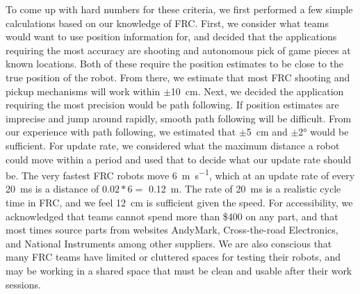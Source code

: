 \documentclass{article}
\begin{document}
  To come up with hard numbers for these criteria, we first performed a few simple calculations based on our knowledge of FRC. First, we consider what teams would want to use position information for, and decided that the applications requiring the most accuracy are shooting and autonomous pick of game pieces at known locations. Both of these require the position estimates to be close to the true position of the robot. From there, we estimate that most FRC shooting and pickup mechanisms will work within $\pm$\SI{10}{\centi\meter}. Next, we decided the application requiring the most precision would be path following. If position estimates are imprecise and jump around rapidly, smooth path following will be difficult. From our experience with path following, we estimated that $\pm$\SI{5}{\centi\meter} and  $\pm$\ang{2} would be sufficient. For update rate, we considered what the maximum distance a robot could move within a period and used that to decide what our update rate should be. The very fastest FRC robots move \SI{6}{\meter\per\second}, which at an update rate of every \SI{20}{\milli\second} is a distance of $0.02*6 =$ \SI{0.12}{\meter}. The rate of \SI{20}{\milli\second} is a realistic cycle time in FRC, and we feel \SI{12}{\centi\meter} is sufficient given the speed. For accessibility, we acknowledged that teams cannot spend more than \$400 on any part, and that most times source parts from websites AndyMark, Cross-the-road Electronics, and National Instruments among other suppliers. We are also conscious that many FRC teams have limited or cluttered spaces for testing their robots, and may be working in a shared space that must be clean and usable after their work sessions.
\end{document}
